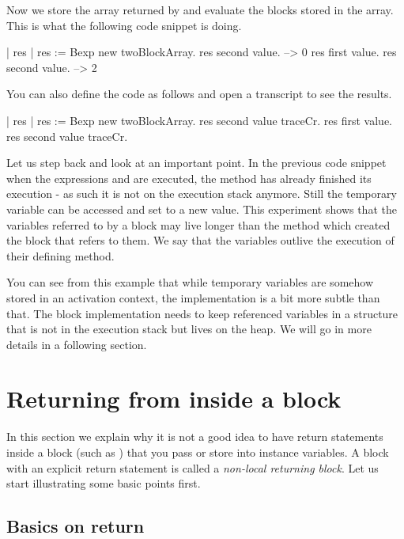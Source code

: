 \documentclass[a4paper,10pt,twoside]{book}
\begin{document}
Now we store the array returned by  and evaluate the blocks stored in the array. This is what the following code snippet is doing.

\begin{code}{}
| res |
res := Bexp new twoBlockArray.
res second value. --> 0
res first value.
res second value. --> 2
\end{code}

You can also define the code as follows and open a transcript to see the results.

\begin{code}{}
| res |
res := Bexp new twoBlockArray.
res second value traceCr.
res first value.
res second value traceCr.
\end{code}

Let us step back and look at an important point.
In the previous code snippet when the expressions  and  are executed, the method  has already finished its execution - as such it is not on the execution stack anymore.  Still the temporary variable  can be accessed and set to a new value. This experiment shows that the variables referred to by a block may live longer than the method which created the block that refers to them. We say that the variables outlive the execution of their defining method.

 You can see from this example that while temporary variables are somehow stored in an activation context, the implementation is a bit more subtle than that. The block implementation needs to keep referenced variables in a structure that is not in the execution stack but lives on the heap. We will go in more details in a following section.


\section{Returning from inside a block}
In this section we explain why it is  not a good idea to have return statements inside a block (such as \ct{[^ 33]}) that you pass or store into instance variables. A block with an explicit return statement is called a \emph{non-local returning block}. Let us start illustrating some basic points first.

\subsection{Basics on return}
\end{document}
